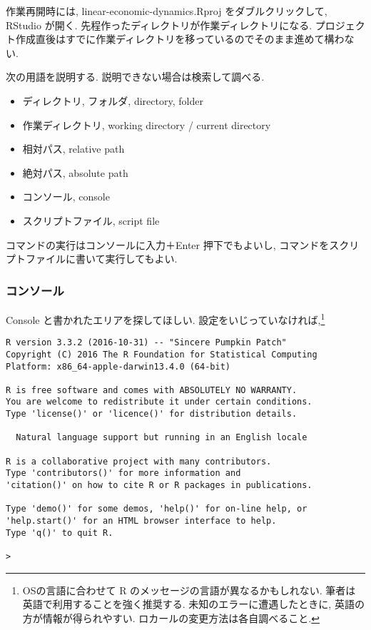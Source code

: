 \documentclass[a4paper]{scrbook}
\providecommand{\tightlist}{%
  \setlength{\itemsep}{0pt}\setlength{\parskip}{0pt}}
\theoremstyle{definition}
\let\BeginKnitrBlock\begin \let\EndKnitrBlock\end
\begin{document}
作業再開時には, linear-economic-dynamics.Rproj をダブルクリックして,
RStudio が開く. 先程作ったディレクトリが作業ディレクトリになる.
プロジェクト作成直後はすでに作業ディレクトリを移っているのでそのまま進めて構わない.

\BeginKnitrBlock{exercise}
次の用語を説明する. 説明できない場合は検索して調べる.

\begin{itemize}
\tightlist
\item
  ディレクトリ, フォルダ, directory, folder
\item
  作業ディレクトリ, working directory / current directory
\item
  相対パス, relative path
\item
  絶対パス, absolute path
\item
  コンソール, console
\item
  スクリプトファイル, script file
\end{itemize}
\EndKnitrBlock{exercise}

コマンドの実行はコンソールに入力＋Enter 押下でもよいし,
コマンドをスクリプトファイルに書いて実行してもよい.

\subsubsection*{コンソール}

Console と書かれたエリアを探してほしい.
設定をいじっていなければ,\footnote{OSの言語に合わせて R
  のメッセージの言語が異なるかもしれない.
  筆者は英語で利用することを強く推奨する. 未知のエラーに遭遇したときに,
  英語の方が情報が得られやすい. ロカールの変更方法は各自調べること.}

\begin{verbatim}
R version 3.3.2 (2016-10-31) -- "Sincere Pumpkin Patch"
Copyright (C) 2016 The R Foundation for Statistical Computing
Platform: x86_64-apple-darwin13.4.0 (64-bit)

R is free software and comes with ABSOLUTELY NO WARRANTY.
You are welcome to redistribute it under certain conditions.
Type 'license()' or 'licence()' for distribution details.

  Natural language support but running in an English locale

R is a collaborative project with many contributors.
Type 'contributors()' for more information and
'citation()' on how to cite R or R packages in publications.

Type 'demo()' for some demos, 'help()' for on-line help, or
'help.start()' for an HTML browser interface to help.
Type 'q()' to quit R.

>
\end{verbatim}
\end{document}
